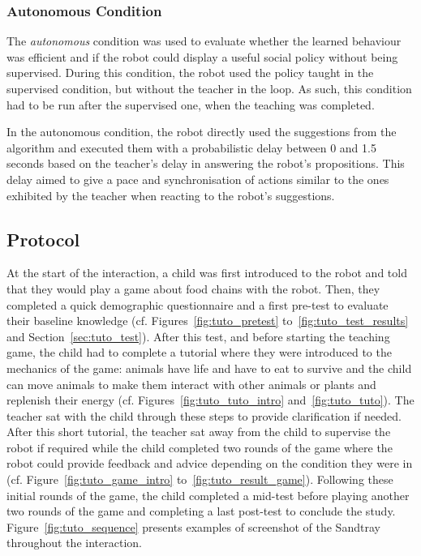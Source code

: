 \subsubsection{Autonomous Condition}

The \textit{autonomous} condition was used to evaluate whether the learned behaviour was efficient and if the robot could display a useful social policy without being supervised. During this condition, the robot used the policy taught in the supervised condition, but without the teacher in the loop. As such, this condition had to be run after the supervised one, when the teaching was completed. 

In the autonomous condition, the robot directly used the suggestions from the algorithm and executed them with a probabilistic delay between 0 and 1.5 seconds based on the teacher's delay in answering the robot's propositions. This delay aimed to give a pace and synchronisation of actions similar to the ones exhibited by the teacher when reacting to the robot's suggestions.

\subsection{Protocol}

At the start of the interaction, a child was first introduced to the robot and told that they would play a game about food chains with the robot. Then, they completed a quick demographic questionnaire and a first pre-test to evaluate their baseline knowledge (cf. Figures~\ref{fig:tuto_pretest} to~\ref{fig:tuto_test_results} and Section~\ref{sec:tuto_test}). After this test, and before starting the teaching game, the child had to complete a tutorial where they were introduced to the mechanics of the game: animals have life and have to eat to survive and the child can move animals to make them interact with other animals or plants and replenish their energy (cf. Figures~\ref{fig:tuto_tuto_intro} and~\ref{fig:tuto_tuto}). The teacher sat with the child through these steps to provide clarification if needed. After this short tutorial, the teacher sat away from the child to supervise the robot if required while the child completed two rounds of the game where the robot could provide feedback and advice depending on the condition they were in (cf. Figure~\ref{fig:tuto_game_intro} to~\ref{fig:tuto_result_game}). Following these initial rounds of the game, the child completed a mid-test before playing another two rounds of the game and completing a last post-test to conclude the study. Figure~\ref{fig:tuto_sequence} presents examples of screenshot of the Sandtray throughout the interaction.

